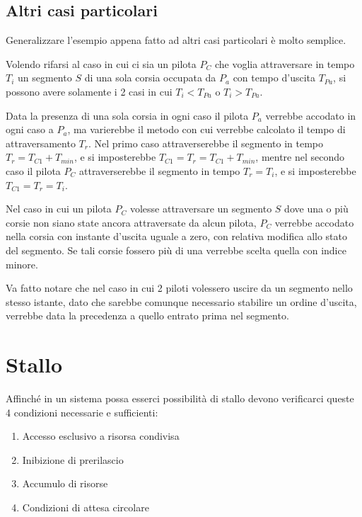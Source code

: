 \documentclass[a4paper,11pt, twoside, openright]{book}
\begin{document}
      \subsection{Altri casi particolari}
        Generalizzare l'esempio appena fatto ad altri casi particolari è molto semplice.
        
        Volendo rifarsi al caso in cui ci sia un pilota $P_C$ che voglia attraversare in tempo $T_i$ un segmento
	$S$ di una sola corsia occupata da $P_a$ con tempo d'uscita $T_{Pa}$, si possono avere solamente i 2 casi
	in cui $T_i < T_{Pa}$ o $T_i > T_{Pa}$. 
	  
	Data la presenza di una sola corsia in ogni caso il pilota $P_{a}$ verrebbe accodato in ogni caso a $P_a$,
	ma varierebbe il metodo con cui verrebbe calcolato il tempo di attraversamento $T_r$.
	Nel primo caso attraverserebbe il segmento
	in tempo $T_r = T_{C1} + T_{min}$, e si imposterebbe $T_{C1} = T_r = T_{C1} + T_{min}$, mentre nel
	secondo caso il pilota $P_{C}$ attraverserebbe il segmento
	in tempo $T_r = T_i$, e si imposterebbe $T_{C1} = T_r = T_i$.
		
	Nel caso in cui un pilota $P_C$ volesse attraversare un segmento $S$ dove una o più corsie non siano state
	ancora attraversate da alcun pilota, $P_C$ verrebbe accodato nella corsia con instante d'uscita uguale a zero,
	con relativa modifica allo stato del segmento. Se
	tali corsie fossero più di una verrebbe scelta quella con indice minore.
	
	Va fatto notare che nel caso in cui 2 piloti volessero uscire da un segmento nello stesso istante,
        dato che sarebbe comunque necessario stabilire un ordine d'uscita, 
	verrebbe data la precedenza a quello entrato prima nel segmento.
	    
    \section{Stallo}
      Affinché in un sistema possa esserci possibilità di stallo devono verificarci queste 4 condizioni
      necessarie e sufficienti:
      
      \begin{enumerate}
       \item Accesso esclusivo a risorsa condivisa
       \item Inibizione di prerilascio
       \item Accumulo di risorse
       \item Condizioni di attesa circolare
      \end{enumerate}
      
\end{document}
